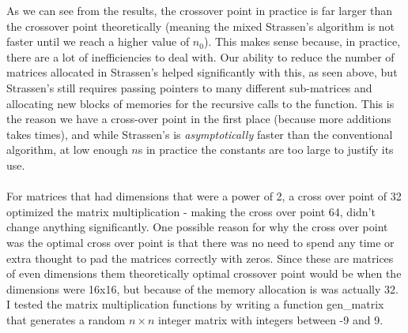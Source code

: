 \documentclass{article}
\begin{document}
	\noindent 
	As we can see from the results, the crossover point in practice is far larger than the crossover point theoretically (meaning the mixed Strassen's algorithm is not faster until we reach a higher value of $n_0$). This makes sense because, in practice, there are a lot of inefficiencies to deal with. Our ability to reduce the number of matrices allocated in Strassen's helped significantly with this, as seen above, but Strassen's still requires passing pointers to many different sub-matrices and allocating new blocks of memories for the recursive calls to the function. This is the reason we have a cross-over point in the first place (because more additions takes times), and while Strassen's is \emph{asymptotically} faster than the conventional algorithm, at low enough $n$s in practice the constants are too large to justify its use. \\\\
	\noindent 
	For matrices that had dimensions that were a power of 2, a cross over point of 32 optimized the matrix multiplication - making the cross over point 64, didn't change anything significantly. One possible reason for why the cross over point was the optimal cross over point is that there was no need to spend any time or extra thought to pad the matrices correctly with zeros. Since these are matrices of even dimensions them theoretically optimal crossover point would be when the dimensions were 16x16, but because of the memory allocation is was actually 32.   I tested the matrix multiplication functions by writing a function gen\_matrix that generates a random $n\times n$ integer matrix with integers between -9 and 9.  \\\\
	
\end{document}
